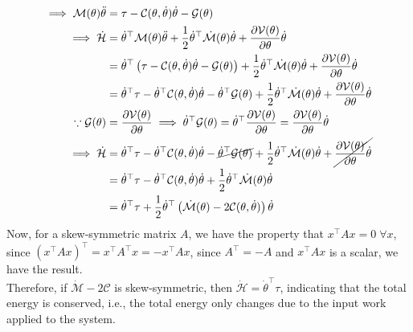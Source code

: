\begin{align*}
    \implies
    \mathcal{M}(\theta) \ddot{\theta}
     & =
    \tau
    -
    \mathcal{C}(\theta, \dot{\theta}) \dot{\theta}
    -
    \mathcal{G}(\theta)
    \\
    \implies
    \dot{\mathcal{H}}
     & =
    \dot{\theta}^{\top} \mathcal{M}(\theta) \ddot{\theta}
    +
    \frac{1}{2}
    \dot{\theta}^{\top} \dot{\mathcal{M}}(\theta) \dot{\theta}
    +
    \frac{\partial \mathcal{V}(\theta)}{\partial \theta} \dot{\theta}
    \\
     & =
    \dot{\theta}^{\top} \left( \tau - \mathcal{C}(\theta, \dot{\theta}) \dot{\theta} - \mathcal{G}(\theta) \right)
    +
    \frac{1}{2}
    \dot{\theta}^{\top} \dot{\mathcal{M}}(\theta) \dot{\theta}
    +
    \frac{\partial \mathcal{V}(\theta)}{\partial \theta} \dot{\theta}
    \\ & =
    \dot{\theta}^{\top} \tau
    -
    \dot{\theta}^{\top} \mathcal{C}(\theta, \dot{\theta}) \dot{\theta}
    -
    \dot{\theta}^{\top} \mathcal{G}(\theta)
    +
    \frac{1}{2}
    \dot{\theta}^{\top} \dot{\mathcal{M}}(\theta) \dot{\theta}
    +
    \frac{\partial \mathcal{V}(\theta)}{\partial \theta} \dot{\theta}
    \\
    \because
    \mathcal{G}(\theta)
     & =
    \frac{\partial \mathcal{V}(\theta)}{\partial \theta}
    \implies
    \dot{\theta}^{\top} \mathcal{G}(\theta)
    =
    \dot{\theta}^{\top} \frac{\partial \mathcal{V}(\theta)}{\partial \theta}
    =
    \frac{\partial \mathcal{V}(\theta)}{\partial \theta} \dot{\theta}
    \\
    \implies
    \dot{\mathcal{H}}
     & =
    \dot{\theta}^{\top} \tau
    -
    \dot{\theta}^{\top} \mathcal{C}(\theta, \dot{\theta}) \dot{\theta}
    -
    \cancel{\dot{\theta}^{\top} \mathcal{G}(\theta)}
    +
    \frac{1}{2}
    \dot{\theta}^{\top} \dot{\mathcal{M}}(\theta) \dot{\theta}
    +
    \cancel{\frac{\partial \mathcal{V}(\theta)}{\partial \theta} \dot{\theta}}
    \\ & =
    \dot{\theta}^{\top} \tau
    -
    \dot{\theta}^{\top} \mathcal{C}(\theta, \dot{\theta}) \dot{\theta}
    +
    \frac{1}{2}
    \dot{\theta}^{\top} \dot{\mathcal{M}}(\theta) \dot{\theta}
    \\ & =
    \dot{\theta}^{\top} \tau
    +
    \frac{1}{2}
    \dot{\theta}^{\top} \left(
    \dot{\mathcal{M}}(\theta)
    -
    2 \mathcal{C}(\theta, \dot{\theta})
    \right)
    \dot{\theta}
\end{align*}
Now, for a skew-symmetric matrix \( A \), we have the property that \( x^\top A x = 0 \; \forall x \), since \( {(x^\top A x)}^\top = x^\top A^\top x = -x^\top A x \), since \( A^\top = -A \) and \( x^\top A x \) is a scalar, we have the result. \\
Therefore, if \( \dot{\mathcal{M}}-2 \mathcal{C} \) is skew-symmetric, then \( \boxed{ \dot{\mathcal{H}} = \dot{\theta}^{\top} \tau} \), indicating that the total energy is conserved, i.e., the total energy only changes due to the input work applied to the system.
